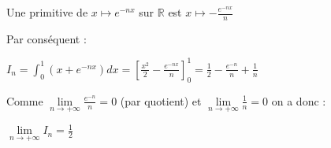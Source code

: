 \begin{corrige}
\begin{enumerate}
          \par
          Une primitive de $x\mapsto e^{-nx}$ sur $\mathbb{R}$ est $x\mapsto -\frac{e^{-nx}}{n}$
          \par
          Par conséquent :
          \par
          $I_{n}=\int_{0}^{1}\left(x+e^{-nx}\right) dx = \left[\frac{x^{2}}{2}-\frac{e^{-nx}}{n}\right]_{0}^{1} = \frac{1}{2}-\frac{e^{-n}}{n}+\frac{1}{n}$
          \par
          Comme $\lim\limits_{n\rightarrow +\infty }\frac{e^{-n}}{n}=0$ (par quotient) et  $\lim\limits_{n\rightarrow +\infty }\frac{1}{n}=0$ on a donc :
          \begin{center}$\lim\limits_{n\rightarrow +\infty }I_{n}=\frac{1}{2}$\end{center}
     \end{enumerate}
\end{corrige}
